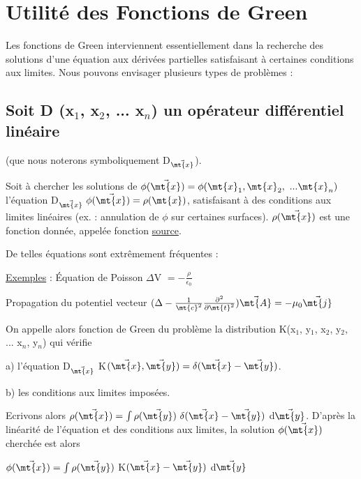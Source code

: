 \section{Utilité des Fonctions de Green}%

Les fonctions de Green interviennent essentiellement dans la
recherche des solutions d'une équation aux dérivées partielles satisfaisant
à certaines conditions aux limites. Nous pouvons envisager plusieurs types
de problèmes :

\subsection{Soit D (x$_1$, x$_2$, ... x$_n$) un opérateur différentiel linéaire}%
\begin{flushright}
(que nous noterons symboliquement D$_{\vec{\mt{x}}}$).
\end{flushright}

Soit à chercher les solutions  de $\phi(\vec{\mt{x}})=\phi(\mt{x}_1,\mt{ x}_2,\ ...\mt{ x}_n)$
l'équation D$_{\vec{\mt{x}}}\ \phi(\vec{\mt{x}})=\rho(\mt{x})$, satisfaisant à des conditions aux limites
linéaires (ex. : annulation de $\phi$ sur certaines surfaces).
$\rho(\vec{\mt{x}})$ est une fonction donnée, appelée fonction \ul{source}.

De telles équations sont extrêmement fréquentes :

\ul{Exemples} : Équation de Poisson \hspace{2cm} $\Delta$V $=-\frac{\rho}{\epsilon_0}$

Propagation du potentiel vecteur \hspace{2cm}
$(\Delta-\frac{1}{\mt{c}^2}\frac{\partial^2}{\partial\mt{t}^2})\vec{\mt{A}}=-\mu_0\vec{\mt{j}}$

On appelle alors fonction de Green du problème la distribution
K(x$_1$, y$_1$, x$_2$, y$_2$, ... x$_n$, y$_n$) qui vérifie

a) l'équation \hspace{2cm} D$_{\vec{\mt{x}}}$ K$(\vec{\mt{x}},\vec{\mt{y}})=\delta(\vec{\mt{x}}-\vec{\mt{y}})$.

b) les conditions aux limites imposées.

Ecrivons alors $\rho(\vec{\mt{x}})=\int\rho(\vec{\mt{y}})\ \delta(\vec{\mt{x}}-\vec{\mt{y}})$ d$\vec{\mt{y}}$.
D'après la linéarité de l'équation et des conditions aux
limites, la solution $\phi(\vec{\mt{x}})$ cherchée est alors
\begin{center}
$\phi(\vec{\mt{x}})=\int\rho(\vec{\mt{y}})$ K$(\vec{\mt{x}}-\vec{\mt{y}})$ d$\vec{\mt{y}}$
\end{center}

